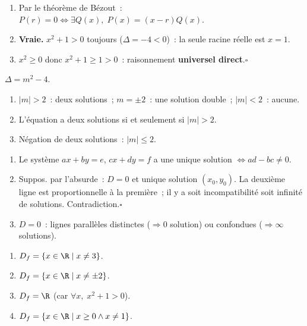 
\begin{enumerate}
  \item Par le th\'eor\`eme de B\'ezout~:
        $P(r)=0\Leftrightarrow\exists Q(x),\;P(x)=(x-r)Q(x)$.
  \item \textbf{Vraie.} $x^2+1>0$ toujours ($\Delta=-4<0$)~:
        la seule racine r\'eelle est $x=1$.
  \item $x^2\geq0$ donc $x^2+1\geq1>0$~: raisonnement \textbf{universel direct}.\hfill$\square$
\end{enumerate}


$\Delta=m^2-4$.
\begin{enumerate}
  \item $|m|>2$~: deux solutions~; $m=\pm2$~: une solution double~; $|m|<2$~: aucune.
  \item \og L'\'equation a deux solutions si et seulement si $|m|>2$.\fg
  \item N\'egation de deux solutions~: $|m|\leq2$.
\end{enumerate}


\begin{enumerate}
  \item Le syst\`eme $ax+by=e$, $cx+dy=f$ a une unique solution
        $\Leftrightarrow ad-bc\ne0$.
  \item Suppos. par l'absurde~: $D=0$ et unique solution $(x_0,y_0)$.
        La deuxi\`eme ligne est proportionnelle \`a la premi\`ere~;
        il y a soit incompatibilit\'e soit infinit\'e de solutions.
        Contradiction.\hfill$\square$
  \item $D=0$~: lignes parall\`eles distinctes ($\Rightarrow0$ solution)
        ou confondues ($\Rightarrow\infty$ solutions).
\end{enumerate}


\begin{enumerate}
  \item $D_f=\{x\in\R\mid x\ne3\}$.
  \item $D_f=\{x\in\R\mid x\ne\pm2\}$.
  \item $D_f=\R$ (car $\forall x,\;x^2+1>0$).
  \item $D_f=\{x\in\R\mid x\geq0\wedge x\ne1\}$.
\end{enumerate}

